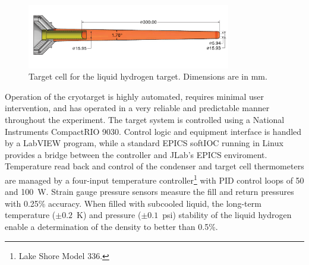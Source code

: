 \begin{figure}
\includegraphics[width=3.5in]{figures/GluexCell_mm.pdf}
\caption{Target cell for the liquid hydrogen target.  Dimensions are in mm.  }
\label{fig:TargetCell}
\end{figure}

Operation of the cryotarget is highly automated, requires minimal user intervention,
and has operated in a very reliable and predictable manner throughout the
experiment.  The target system is controlled using a
National Instruments CompactRIO 9030. 
Control logic and equipment interface is handled by a LabVIEW program, 
while a standard EPICS softIOC running in Linux provides a
bridge between the controller and JLab's EPICS enviroment.     
Temperature read back and control of the condenser and target cell thermometers
are managed by a four-input temperature
controller\footnote{Lake Shore Model 336.} with PID control loops of 50 and 100~W.
Strain gauge pressure sensors measure the fill and return pressures with 0.25\% 
accuracy.  When filled with subcooled liquid, 
the long-term temperature ($\pm 0.2$~K) and pressure ($\pm 0.1$~psi)
stability of the liquid hydrogen enable a determination of the density to better than 0.5\%.


